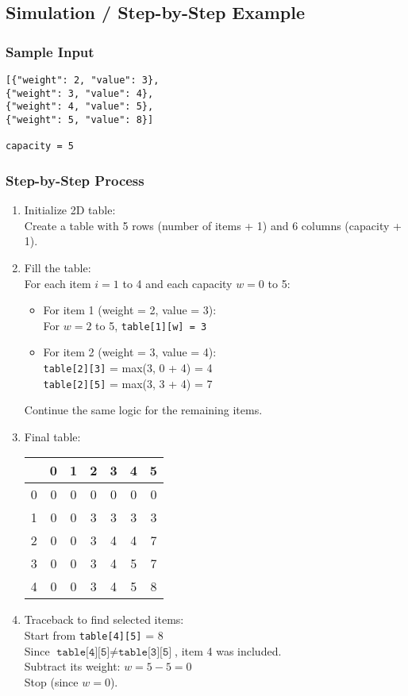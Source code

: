 \documentclass{article}
\begin{document}
\subsection*{Simulation / Step-by-Step Example} 
\subsubsection*{Sample Input}
\begin{verbatim}
[{"weight": 2, "value": 3}, 
{"weight": 3, "value": 4}, 
{"weight": 4, "value": 5}, 
{"weight": 5, "value": 8}]

capacity = 5
\end{verbatim}
\subsubsection*{Step-by-Step Process}
\begin{enumerate}
    \item Initialize 2D table: \\
    Create a table with 5 rows (number of items + 1) and 6 columns (capacity + 1).

    \item Fill the table: \\
    For each item \( i = 1 \) to 4 and each capacity \( w = 0 \) to 5:
    \begin{itemize}
        \item For item 1 (weight = 2, value = 3): \\
        For \( w = 2 \) to 5, \texttt{table[1][w] = 3}
        \item For item 2 (weight = 3, value = 4): \\
        \texttt{table[2][3]} = max(3, 0 + 4) = 4 \\
        \texttt{table[2][5]} = max(3, 3 + 4) = 7
    \end{itemize}
    Continue the same logic for the remaining items.

    \item Final table:
    \begin{center}
    \begin{tabular}{|c|c|c|c|c|c|c|}
    \hline
    & 0 & 1 & 2 & 3 & 4 & 5 \\
    \hline
    0 & 0 & 0 & 0 & 0 & 0 & 0 \\
    1 & 0 & 0 & 3 & 3 & 3 & 3 \\
    2 & 0 & 0 & 3 & 4 & 4 & 7 \\
    3 & 0 & 0 & 3 & 4 & 5 & 7 \\
    4 & 0 & 0 & 3 & 4 & 5 & 8 \\
    \hline
    \end{tabular}
    \end{center}

    \item Traceback to find selected items: \\
    Start from \texttt{table[4][5]} = 8 \\
    Since $\texttt{table[4][5]} \ne \texttt{table[3][5]}$, item 4 was included. \\
    Subtract its weight: \( w = 5 - 5 = 0 \) \\
    Stop (since \( w = 0 \)).
\end{enumerate}
\end{document}
